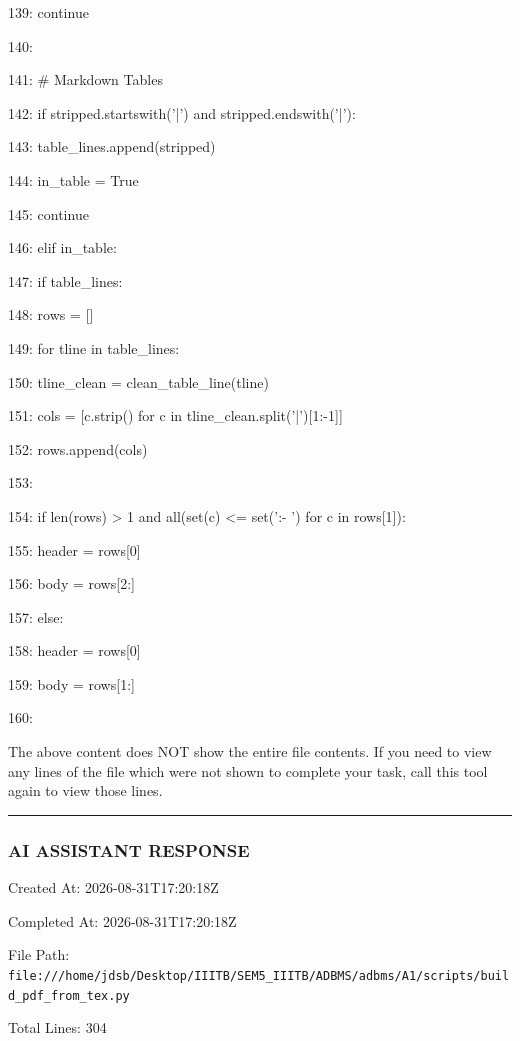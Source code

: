 \documentclass[11pt,a4paper]{article}
\begin{document}
139:             continue

140:

141:         \# Markdown Tables

142:         if stripped.startswith('|') and stripped.endswith('|'):

143:             table\_lines.append(stripped)

144:             in\_table = True

145:             continue

146:         elif in\_table:

147:             if table\_lines:

148:                 rows = []

149:                 for tline in table\_lines:

150:                     tline\_clean = clean\_table\_line(tline)

151:                     cols = [c.strip() for c in tline\_clean.split('|')[1:-1]]

152:                     rows.append(cols)

153:

154:                 if len(rows) > 1 and all(set(c) <= set(':- ') for c in rows[1]):

155:                     header = rows[0]

156:                     body = rows[2:]

157:                 else:

158:                     header = rows[0]

159:                     body = rows[1:]

160:

The above content does NOT show the entire file contents. If you need to view any lines of the file which were not shown to complete your task, call this tool again to view those lines.


\hrule

\subsubsection{AI ASSISTANT RESPONSE}

Created At: 2026-08-31T17:20:18Z

Completed At: 2026-08-31T17:20:18Z

File Path: \texttt{file:///home/jdsb/Desktop/IIITB/SEM5\_IIITB/ADBMS/adbms/A1/scripts/build\_pdf\_from\_tex.py}

Total Lines: 304
\end{document}

